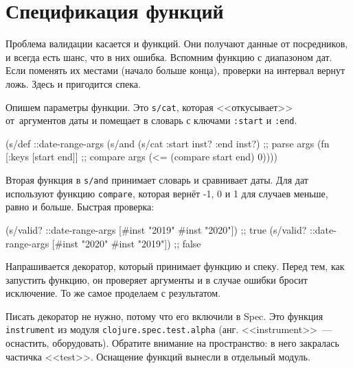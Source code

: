 \section{Спецификация функций}


Проблема валидации касается и функций. Они получают данные от посредников, и
всегда есть шанс, что в них ошибка. Вспомним функцию с диапазоном дат. Если
поменять их местами (начало больше конца), проверки на интервал вернут
ложь. Здесь и пригодится спека.

Опишем параметры функции. Это \verb|s/cat|, которая <<откусывает>>
от~аргументов даты и помещает в словарь с ключами \verb|:start| и
\verb|:end|.

\begin{english}
  \begin{clojure}
(s/def ::date-range-args
  (s/and
   (s/cat :start inst? :end inst?) ;; parse args
   (fn [{:keys [start end]}]       ;; compare args
     (<= (compare start end) 0))))
  \end{clojure}
\end{english}


Вторая функция в \verb|s/and| принимает словарь и сравнивает даты. Для дат
используют функцию \verb|compare|, которая вернёт -1, 0 и 1 для случаев
меньше, равно и больше. Быстрая проверка:

\begin{english}
  \begin{clojure}
(s/valid? ::date-range-args [#inst "2019" #inst "2020"]) ;; true
(s/valid? ::date-range-args [#inst "2020" #inst "2019"]) ;; false
  \end{clojure}
\end{english}


Напрашивается декоратор, который принимает функцию и спеку. Перед тем, как
запустить функцию, он проверяет аргументы и в случае ошибки бросит исключение. То
же самое проделаем с результатом.


Писать декоратор не нужно, потому что его включили в Spec. Это функция
\verb|instrument| из модуля \verb|clojure.spec.test.alpha|
(анг. <<instrument>>~--- оснастить, оборудовать). Обратите внимание на пространство:
в него закралась частичка <<test>>. Оснащение функций вынесли в отдельный
модуль.

